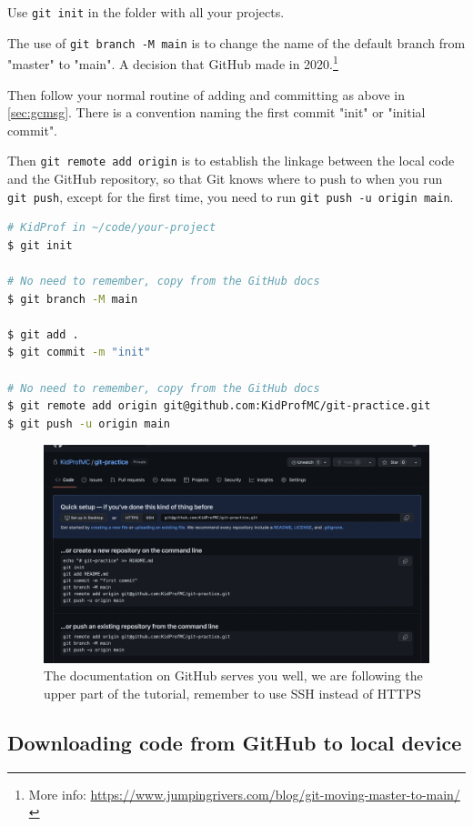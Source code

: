 Use \texttt{git init} in the folder with all your projects.

The use of \texttt{git branch -M main} is to change the name of the default branch from "master" to "main". A decision that GitHub made in 2020.\footnote{More info: \url{https://www.jumpingrivers.com/blog/git-moving-master-to-main/}}

Then follow your normal routine of adding and committing as above in \cref{sec:gcmsg}. There is a convention naming the first commit "init" or "initial commit".

Then \texttt{git remote add origin} is to establish the linkage between the local code and the GitHub repository, so that Git knows where to push to when you run \texttt{git push}, except for the first time, you need to run \texttt{git push -u origin main}.

\begin{lstlisting}[language=bash]
# KidProf in ~/code/your-project
$ git init

# No need to remember, copy from the GitHub docs
$ git branch -M main 

$ git add .
$ git commit -m "init"

# No need to remember, copy from the GitHub docs
$ git remote add origin git@github.com:KidProfMC/git-practice.git
$ git push -u origin main
\end{lstlisting}

\begin{figure}[h]
\centering
\includegraphics[width=15cm]{images/ch3-newrepocode.png}
\caption{The documentation on GitHub serves you well, we are following the upper part of the tutorial, remember to use SSH instead of HTTPS}
\end{figure}

\subsection{Downloading code from GitHub to local device}
\label{sec:gitclone}

